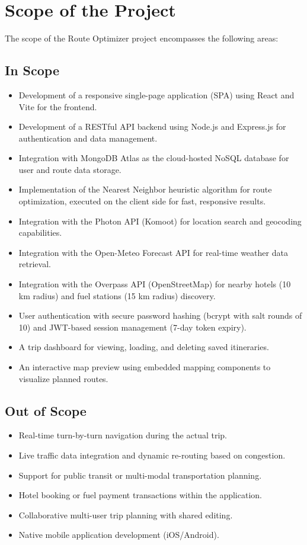 \section{Scope of the Project}
The scope of the Route Optimizer project encompasses the following areas:

\subsection{In Scope}
\begin{itemize}
    \item Development of a responsive single-page application (SPA) using React and Vite for the frontend.
    \item Development of a RESTful API backend using Node.js and Express.js for authentication and data management.
    \item Integration with MongoDB Atlas as the cloud-hosted NoSQL database for user and route data storage.
    \item Implementation of the Nearest Neighbor heuristic algorithm for route optimization, executed on the client side for fast, responsive results.
    \item Integration with the Photon API (Komoot) for location search and geocoding capabilities.
    \item Integration with the Open-Meteo Forecast API for real-time weather data retrieval.
    \item Integration with the Overpass API (OpenStreetMap) for nearby hotels (10 km radius) and fuel stations (15 km radius) discovery.
    \item User authentication with secure password hashing (bcrypt with salt rounds of 10) and JWT-based session management (7-day token expiry).
    \item A trip dashboard for viewing, loading, and deleting saved itineraries.
    \item An interactive map preview using embedded mapping components to visualize planned routes.
\end{itemize}

\subsection{Out of Scope}
\begin{itemize}
    \item Real-time turn-by-turn navigation during the actual trip.
    \item Live traffic data integration and dynamic re-routing based on congestion.
    \item Support for public transit or multi-modal transportation planning.
    \item Hotel booking or fuel payment transactions within the application.
    \item Collaborative multi-user trip planning with shared editing.
    \item Native mobile application development (iOS/Android).
\end{itemize}

